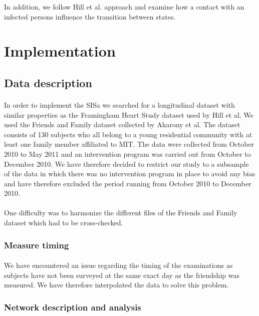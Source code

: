 \documentclass[11pt]{article}
\begin{document}
In addition, we follow Hill et al. approach and examine how a contact with an infected persons influence the transition between states.

\section{Implementation}

\subsection{Data description}
\paragraph{}
In order to implement the SISa we searched for a longitudinal dataset with similar properties as the Framingham Heart Study dataset used by Hill et al. We used the Friends and Family dataset collected by Aharony et al. The dataset consists of 130 subjects who all belong to a young residential community with at least one family member affiliated to MIT. The data were collected from October 2010 to May 2011 and an intervention program was carried out from October to December 2010. We have therefore decided to restrict our study to a subsample of the data in which there was no intervention program in place to avoid any bias and have therefore excluded the period running from October 2010 to December 2010. 

\paragraph{}

One difficulty was to harmonize the different files of the Friends and Family dataset which had to be cross-checked.

\subsubsection{Measure timing}
\paragraph{}
We have encountered an issue regarding the timing of the examinations as subjects have not been surveyed at the same exact day as the friendship was measured. We have therefore interpolated the data to solve this problem.

\subsubsection{Network description and analysis}
\end{document}
